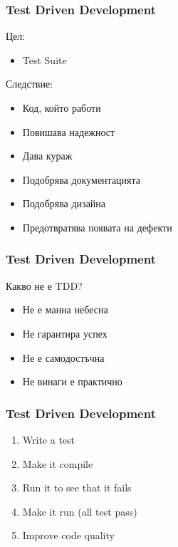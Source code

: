 \begin{frame}
  \frametitle{Test Driven Development}
    \begin{minipage}[t]{0.28\linewidth}
        Цел:
        \begin{itemize}
            \item Test Suite
        \end{itemize}
    \end{minipage}\hfill
    \begin{minipage}[t]{0.68\linewidth}
        Следствие:
        \begin{itemize}
            \item Код, който работи
            \item Повишава надежност 
            \item Дава кураж
            \item Подобрява документацията
            \item Подобрява дизайна
            \item Предотвратява появата на дефекти
        \end{itemize}
    \end{minipage}
\end{frame}

\begin{frame}
  \frametitle{Test Driven Development}
  Какво не е TDD?
  \begin{itemize}
    \item Не е манна небесна
    \item Не гарантира успех
    \item Не е самодостъчна
    \item Не винаги е практично
  \end{itemize}
\end{frame}

\begin{frame}
  \frametitle{Test Driven Development}
  \begin{enumerate} 
    \item Write a test
    \item Make it compile
    \item Run it to see that it fails
    \item Make it run (all test pass)
    \item Improve code quality
  \end{enumerate} 
\end{frame}
